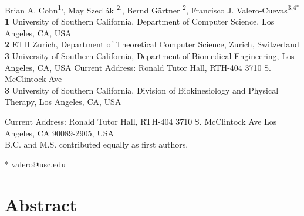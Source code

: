\documentclass[letterpaper]{article}
\date{}
\begin{document}
\vspace*{0.2in}

\begin{flushleft}
{\Large

\textbf{}
}


Brian A. Cohn\textsuperscript{1,\Yinyang},
May Szedl\'{a}k \textsuperscript{2,\Yinyang},
Bernd G{\"a}rtner \textsuperscript{2},
Francisco J. Valero-Cuevas\textsuperscript{3,4*}
\\
\bigskip
\textbf{1} University of Southern California, Department of Computer Science, Los Angeles, CA, USA
\\
\textbf{2} ETH Zurich, Department of Theoretical Computer Science, Zurich, Switzerland
\\
\textbf{3} University of Southern California, Department of Biomedical Engineering, Los Angeles, CA, USA
Current Address: Ronald Tutor Hall, RTH-404
3710 S. McClintock Ave
\\
\textbf{3} University of Southern California, Division of Biokinesiology and Physical Therapy, Los Angeles, CA, USA

Current Address: Ronald Tutor Hall, RTH-404
3710 S. McClintock Ave
Los Angeles, CA 90089-2905, USA %
\\
\Yinyang  B.C. and M.S. contributed equally as first authors.

* valero@usc.edu

\end{flushleft}
\section*{Abstract}



\end{document}
